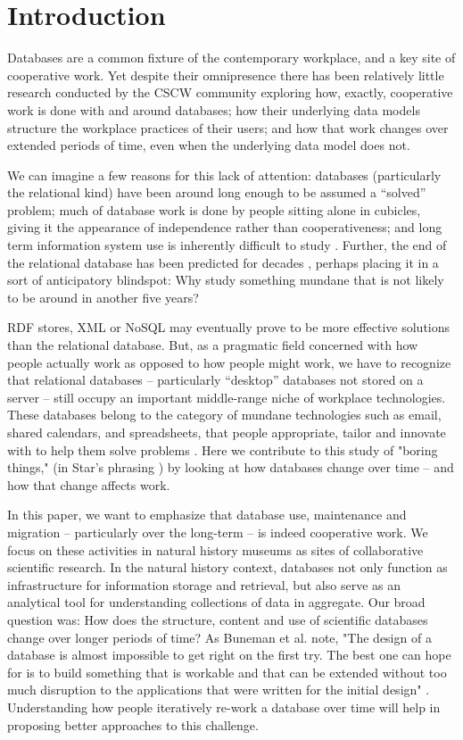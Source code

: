 \section{Introduction}

Databases are a common fixture of the contemporary workplace, and a key site of cooperative work. Yet despite their omnipresence there has been relatively little research conducted by the CSCW community exploring how, exactly, cooperative work is done with and around databases;  how their underlying data models structure the workplace practices of their users; and how that work changes over extended periods of time, even when the underlying data model does not. 

We can imagine a few reasons for this lack of attention: databases (particularly the relational kind) have been around long enough to be assumed a “solved” problem; much of database work is done by people sitting alone in cubicles, giving it the appearance of independence rather than cooperativeness; and long term information system use is inherently difficult to study \cite{Pipek_2002}. Further, the end of the relational database has been predicted for decades \cite{Atzeni_2013}, perhaps placing it in a sort of anticipatory blindspot: Why study something mundane that is not likely to be around in another five years? 

RDF stores, XML or NoSQL may eventually prove to be more effective solutions than the relational database. But, as a pragmatic field concerned with how people actually work as opposed to how people might work, we have to recognize that relational databases – particularly “desktop” databases not stored on a server – still occupy an important middle-range niche of workplace technologies. These databases belong to the category of mundane technologies such as email, shared calendars, and spreadsheets, that people appropriate, tailor and innovate with to help them solve problems  \cite{bellotti2005quality, palen1999social, nardi1991twinkling}. Here we contribute to this study of "boring things," (in Star's phrasing \cite{star1999ethnography}) by looking at how databases change over time -- and how that change affects work.

In this paper, we want to emphasize that database use, maintenance and migration – particularly over the long-term – is indeed cooperative work. We focus on these activities in natural history museums as sites of collaborative scientific research. In the natural history context, databases not only function as infrastructure for information storage and retrieval, but also serve as an analytical tool for understanding collections of data in aggregate. Our broad question was: How does the structure, content and use of scientific databases change over longer periods of time? As Buneman et al. note, "The design of a database is almost impossible to get right on the first try. The best one can hope for is to build something that is workable and that can be extended without too much disruption to the applications that were written for the initial design" \cite{buneman2008curated}. Understanding how people iteratively re-work a database over time will help in proposing better approaches to this challenge.

